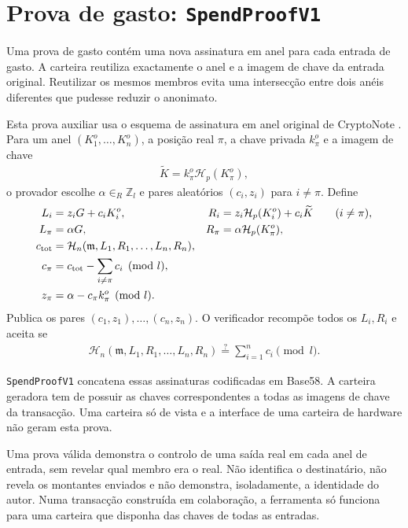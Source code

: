 \section{Prova de gasto: \texttt{SpendProofV1}}
\label{subsec:proofs-input-creation-spendproof}

%
Uma prova de gasto contém uma nova assinatura em anel para cada entrada de
gasto. A carteira
reutiliza exactamente o anel e a imagem de chave da entrada original.
Reutilizar os mesmos membros evita uma intersecção entre dois anéis diferentes
que pudesse reduzir o anonimato.

Esta prova auxiliar usa o esquema de
assinatura em anel original de CryptoNote \cite{cryptoNoteWhitePaper}. Para um
anel \((K_1^o,\ldots,K_n^o)\), a posição real \(\pi\), a chave privada
\(k_\pi^o\) e a imagem de chave
\begin{align*}
 \widetilde K=k_\pi^o\mathcal H_p(K_\pi^o),
\end{align*}
o provador escolhe \(\alpha\in_R\mathbb Z_l\) e pares aleatórios
\((c_i,z_i)\) para \(i\neq\pi\). Define
\begin{align*}
 L_i&=z_iG+c_iK_i^o,&
 R_i&=z_i\mathcal H_p(K_i^o)+c_i\widetilde K
 \qquad(i\neq\pi),\\
 L_\pi&=\alpha G,&
 R_\pi&=\alpha\mathcal H_p(K_\pi^o),\\
 c_{\rm tot}&=\mathcal H_n(\mathfrak m,L_1,R_1,\ldots,L_n,R_n),\\
 c_\pi&=c_{\rm tot}-\sum_{i\neq\pi}c_i\pmod l,\\
 z_\pi&=\alpha-c_\pi k_\pi^o\pmod l.
\end{align*}
%
Publica os pares \((c_1,z_1),\ldots,(c_n,z_n)\). O verificador recompõe todos
os \(L_i,R_i\) e aceita se
\begin{align*}
 \mathcal H_n(\mathfrak m,L_1,R_1,\ldots,L_n,R_n)
 \stackrel{?}{=}\sum_{i=1}^n c_i\pmod l.
\end{align*}

\texttt{SpendProofV1} concatena essas assinaturas codificadas em Base58. A
carteira geradora tem de possuir as chaves correspondentes a todas as imagens
de chave da transacção. Uma carteira só de vista e a interface de uma carteira
de hardware não geram esta prova.

Uma prova válida demonstra o controlo de uma saída real em cada anel de
entrada, sem revelar qual membro era o real. Não identifica o destinatário,
não revela os montantes enviados e não demonstra, isoladamente, a identidade
do autor. Numa transacção construída em colaboração, a ferramenta só funciona
para uma carteira que disponha das chaves de todas as entradas.

